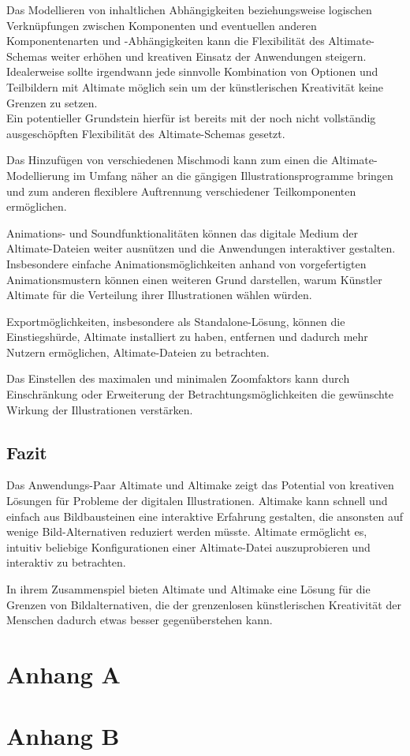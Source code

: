 \documentclass[oneside]{ausarbeitung}
\begin{document}
Das Modellieren von inhaltlichen Abhängigkeiten beziehungsweise logischen Verknüpfungen zwischen Komponenten und eventuellen anderen Komponentenarten und -Abhängigkeiten kann die Flexibilität des Altimate-Schemas weiter erhöhen und kreativen Einsatz der Anwendungen steigern. Idealerweise sollte irgendwann jede sinnvolle Kombination von Optionen und Teilbildern mit Altimate möglich sein um der künstlerischen Kreativität keine Grenzen zu setzen.\\
Ein potentieller Grundstein hierfür ist bereits mit der noch nicht vollständig ausgeschöpften Flexibilität des Altimate-Schemas gesetzt.

Das Hinzufügen von verschiedenen Mischmodi kann zum einen die Altimate-Modellierung im Umfang näher an die gängigen Illustrationsprogramme bringen und zum anderen flexiblere Auftrennung verschiedener Teilkomponenten ermöglichen.

Animations- und Soundfunktionalitäten können das digitale Medium der Altimate-Dateien weiter ausnützen und die Anwendungen interaktiver gestalten. Insbesondere einfache Animationsmöglichkeiten anhand von vorgefertigten Animationsmustern können einen weiteren Grund darstellen, warum Künstler Altimate für die Verteilung ihrer Illustrationen wählen würden.

Exportmöglichkeiten, insbesondere als Standalone-Lösung, können die Einstiegshürde, Altimate installiert zu haben, entfernen und dadurch mehr Nutzern ermöglichen, Altimate-Dateien zu betrachten.

Das Einstellen des maximalen und minimalen Zoomfaktors kann durch Einschränkung oder Erweiterung der Betrachtungsmöglichkeiten die gewünschte Wirkung der Illustrationen verstärken.



\section{Fazit}

Das Anwendungs-Paar Altimate und Altimake zeigt das Potential von kreativen Lösungen für Probleme der digitalen Illustrationen. Altimake kann schnell und einfach aus Bildbausteinen eine interaktive Erfahrung gestalten, die ansonsten auf wenige Bild-Alternativen reduziert werden müsste. Altimate ermöglicht es, intuitiv beliebige Konfigurationen einer Altimate-Datei auszuprobieren und interaktiv zu betrachten. 

In ihrem Zusammenspiel bieten Altimate und Altimake eine Lösung für die Grenzen von Bildalternativen, die der grenzenlosen künstlerischen Kreativität der Menschen dadurch etwas besser gegenüberstehen kann.



\appendix

\printbibliography[heading=bibintoc]

\chapter{Anhang A}

\chapter{Anhang B}
\end{document}
